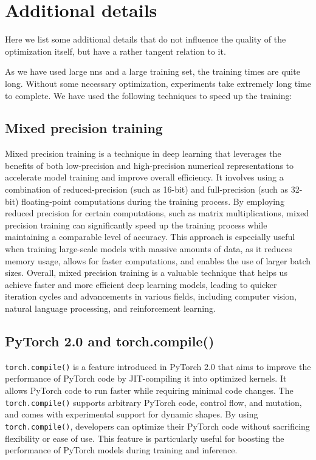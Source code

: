 \section{Additional details}

Here we list some additional details that do not influence the quality of the optimization itself, but have a rather
tangent relation to it.

As we have used large \glspl{nn} and a large training set, the training times are quite long. Without some necessary
optimization, experiments take extremely long time to complete. We have used the following techniques to speed up the
training:

\subsection{Mixed precision training}

Mixed precision training is a technique in deep learning that leverages the benefits of both low-precision and
high-precision numerical representations to accelerate model training and improve overall efficiency. It involves using
a combination of reduced-precision (such as 16-bit) and full-precision (such as 32-bit) floating-point computations
during the training process. By employing reduced precision for certain computations, such as matrix multiplications,
mixed precision training can significantly speed up the training process while maintaining a comparable level of
accuracy. This approach is especially useful when training large-scale models with massive amounts of data, as it
reduces memory usage, allows for faster computations, and enables the use of larger batch sizes. Overall, mixed
precision training is a valuable technique that helps us achieve faster and more efficient deep learning models, leading
to quicker iteration cycles and advancements in various fields, including computer vision, natural language processing,
and reinforcement learning.


\subsection{PyTorch 2.0 and torch.compile()}

\verb|torch.compile()| is a feature introduced in PyTorch 2.0 \cite{pytorch} that aims to improve the performance of
PyTorch code by JIT-compiling it into optimized kernels. It allows PyTorch code to run faster while requiring minimal
code changes. The \verb|torch.compile()| supports arbitrary PyTorch code, control flow, and mutation, and comes with
experimental support for dynamic shapes. By using \verb|torch.compile()|, developers can optimize their PyTorch code
without sacrificing flexibility or ease of use.  This feature is particularly useful for boosting the performance of
PyTorch models during training and inference.

